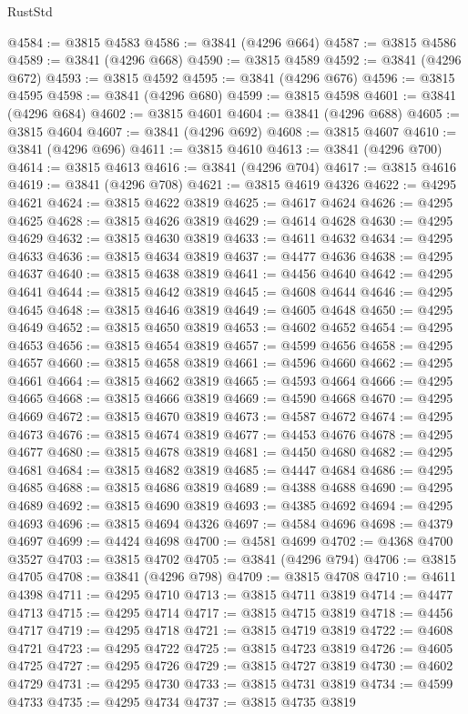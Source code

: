 \begin{lexlean}{RustStd}
\begin{coremodule}
@4584 := @3815 @4583
@4586 := @3841 (@4296 @664)
@4587 := @3815 @4586
@4589 := @3841 (@4296 @668)
@4590 := @3815 @4589
@4592 := @3841 (@4296 @672)
@4593 := @3815 @4592
@4595 := @3841 (@4296 @676)
@4596 := @3815 @4595
@4598 := @3841 (@4296 @680)
@4599 := @3815 @4598
@4601 := @3841 (@4296 @684)
@4602 := @3815 @4601
@4604 := @3841 (@4296 @688)
@4605 := @3815 @4604
@4607 := @3841 (@4296 @692)
@4608 := @3815 @4607
@4610 := @3841 (@4296 @696)
@4611 := @3815 @4610
@4613 := @3841 (@4296 @700)
@4614 := @3815 @4613
@4616 := @3841 (@4296 @704)
@4617 := @3815 @4616
@4619 := @3841 (@4296 @708)
@4621 := @3815 @4619 @4326
@4622 := @4295 @4621
@4624 := @3815 @4622 @3819
@4625 := @4617 @4624
@4626 := @4295 @4625
@4628 := @3815 @4626 @3819
@4629 := @4614 @4628
@4630 := @4295 @4629
@4632 := @3815 @4630 @3819
@4633 := @4611 @4632
@4634 := @4295 @4633
@4636 := @3815 @4634 @3819
@4637 := @4477 @4636
@4638 := @4295 @4637
@4640 := @3815 @4638 @3819
@4641 := @4456 @4640
@4642 := @4295 @4641
@4644 := @3815 @4642 @3819
@4645 := @4608 @4644
@4646 := @4295 @4645
@4648 := @3815 @4646 @3819
@4649 := @4605 @4648
@4650 := @4295 @4649
@4652 := @3815 @4650 @3819
@4653 := @4602 @4652
@4654 := @4295 @4653
@4656 := @3815 @4654 @3819
@4657 := @4599 @4656
@4658 := @4295 @4657
@4660 := @3815 @4658 @3819
@4661 := @4596 @4660
@4662 := @4295 @4661
@4664 := @3815 @4662 @3819
@4665 := @4593 @4664
@4666 := @4295 @4665
@4668 := @3815 @4666 @3819
@4669 := @4590 @4668
@4670 := @4295 @4669
@4672 := @3815 @4670 @3819
@4673 := @4587 @4672
@4674 := @4295 @4673
@4676 := @3815 @4674 @3819
@4677 := @4453 @4676
@4678 := @4295 @4677
@4680 := @3815 @4678 @3819
@4681 := @4450 @4680
@4682 := @4295 @4681
@4684 := @3815 @4682 @3819
@4685 := @4447 @4684
@4686 := @4295 @4685
@4688 := @3815 @4686 @3819
@4689 := @4388 @4688
@4690 := @4295 @4689
@4692 := @3815 @4690 @3819
@4693 := @4385 @4692
@4694 := @4295 @4693
@4696 := @3815 @4694 @4326
@4697 := @4584 @4696
@4698 := @4379 @4697
@4699 := @4424 @4698
@4700 := @4581 @4699
@4702 := @4368 @4700 @3527
@4703 := @3815 @4702
@4705 := @3841 (@4296 @794)
@4706 := @3815 @4705
@4708 := @3841 (@4296 @798)
@4709 := @3815 @4708
@4710 := @4611 @4398
@4711 := @4295 @4710
@4713 := @3815 @4711 @3819
@4714 := @4477 @4713
@4715 := @4295 @4714
@4717 := @3815 @4715 @3819
@4718 := @4456 @4717
@4719 := @4295 @4718
@4721 := @3815 @4719 @3819
@4722 := @4608 @4721
@4723 := @4295 @4722
@4725 := @3815 @4723 @3819
@4726 := @4605 @4725
@4727 := @4295 @4726
@4729 := @3815 @4727 @3819
@4730 := @4602 @4729
@4731 := @4295 @4730
@4733 := @3815 @4731 @3819
@4734 := @4599 @4733
@4735 := @4295 @4734
@4737 := @3815 @4735 @3819

\end{coremodule}
\end{lexlean}
